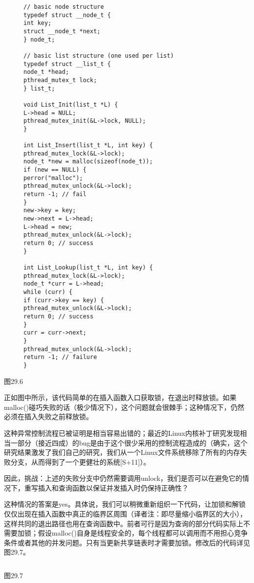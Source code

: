 \begin{figure}[h]
\begin{lstlisting}
// basic node structure
typedef struct __node_t {
int key;
struct __node_t *next;
} node_t;

// basic list structure (one used per list)
typedef struct __list_t {
node_t *head;
pthread_mutex_t lock;
} list_t;

void List_Init(list_t *L) {
L->head = NULL;
pthread_mutex_init(&L->lock, NULL);
}

int List_Insert(list_t *L, int key) {
pthread_mutex_lock(&L->lock);
node_t *new = malloc(sizeof(node_t));
if (new == NULL) {
perror("malloc");
pthread_mutex_unlock(&L->lock);
return -1; // fail
}
new->key = key;
new->next = L->head;
L->head = new;
pthread_mutex_unlock(&L->lock);
return 0; // success
}

int List_Lookup(list_t *L, int key) {
pthread_mutex_lock(&L->lock);
node_t *curr = L->head;
while (curr) {
if (curr->key == key) {
pthread_mutex_unlock(&L->lock);
return 0; // success
}
curr = curr->next;
}
pthread_mutex_unlock(&L->lock);
return -1; // failure
}
\end{lstlisting}
\caption{}
\end{figure}
图29.6

正如图中所示，该代码简单的在插入函数入口获取锁，在退出时释放锁。如果malloc()碰巧失败的话（极少情况下），这个问题就会很棘手；这种情况下，仍然必须在插入失败之前释放锁。

这种异常控制流程已被证明是相当容易出错的；最近的Linux内核补丁研究发现相当一部分（接近四成）的bug是由于这个很少采用的控制流程造成的（确实，这个研究结果激发了我们自己的研究，我们从一个Linux文件系统移除了所有的内存失败分支，从而得到了一个更健壮的系统[S+11]）。

因此，挑战：上述的失败分支中仍然需要调用unlock，我们是否可以在避免它的情况下，重写插入和查询函数以保证并发插入时仍保持正确性？

这种情况的答案是yes。具体说，我们可以稍微重新组织一下代码，让加锁和解锁仅仅出现在插入函数中真正的临界区周围（译者注：即尽量缩小临界区的大小），这样共同的退出路径也用在查询函数中。前者可行是因为查询的部分代码实际上不需要加锁；假设malloc()自身是线程安全的，每个线程都可以调用而不用担心竞争条件或者其他的并发问题。只有当更新共享链表时才需要加锁。修改后的代码详见图29.7。

\begin{figure}[h]
\begin{lstlisting}

\end{lstlisting}
\caption{}
\end{figure}
图29.7

